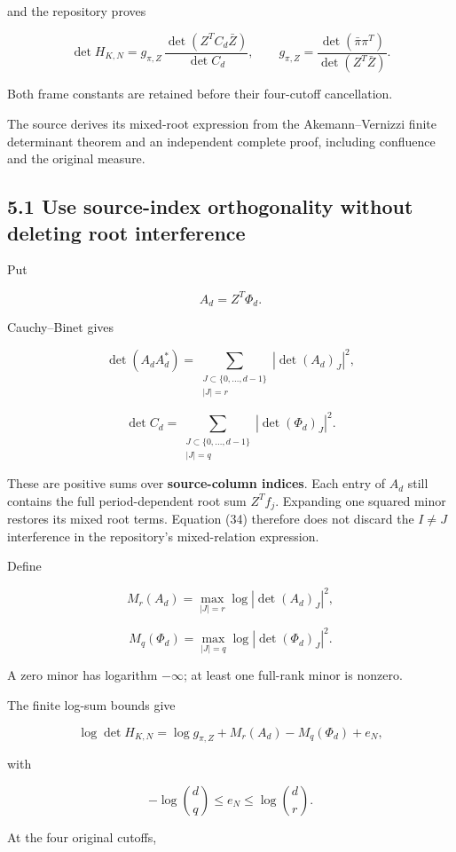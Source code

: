 \documentclass[11pt]{article}
\begin{document}
and the repository proves

\[
\boxed{
\det H_{K,N}
=
g_{\pi,Z}\,
\frac{\det(Z^TC_d\bar Z)}{\det C_d},
\qquad
g_{\pi,Z}
=
\frac{\det(\bar\pi\pi^T)}{\det(Z^T\bar Z)}.
}
\tag{33}
\]

Both frame constants are retained before their four-cutoff cancellation.

The source derives its mixed-root expression from the Akemann--Vernizzi finite determinant theorem and an independent complete proof, including confluence and the original measure.

\subsection{5.1 Use source-index orthogonality without deleting root interference}\label{use-source-index-orthogonality-without-deleting-root-interference}

Put

\[
A_d=Z^T\Phi_d.
\]

Cauchy--Binet gives

\[
\boxed{
\det(A_dA_d^*)
=
\sum_{\substack{J\subset\{0,\ldots,d-1\}\\|J|=r}}
|\det(A_d)_J|^2,
}
\]

\[
\boxed{
\det C_d
=
\sum_{\substack{J\subset\{0,\ldots,d-1\}\\|J|=q}}
|\det(\Phi_d)_J|^2.
}
\tag{34}
\]

These are positive sums over \textbf{source-column indices}. Each entry of \(A_d\) still contains the full period-dependent root sum \(Z^Tf_j\). Expanding one squared minor restores its mixed root terms. Equation (34) therefore does not discard the \(I\ne J\) interference in the repository's mixed-relation expression.

Define

\[
M_r(A_d)=
\max_{|J|=r}\log|\det(A_d)_J|^2,
\]

\[
M_q(\Phi_d)=
\max_{|J|=q}\log|\det(\Phi_d)_J|^2.
\]

A zero minor has logarithm \(-\infty\); at least one full-rank minor is nonzero.

The finite log-sum bounds give

\[
\boxed{
\log\det H_{K,N}
=
\log g_{\pi,Z}+M_r(A_d)-M_q(\Phi_d)+e_N,
}
\tag{35}
\]

with

\[
\boxed{
-\log\binom dq\le e_N\le\log\binom dr.
}
\tag{36}
\]

At the four original cutoffs,
\end{document}
